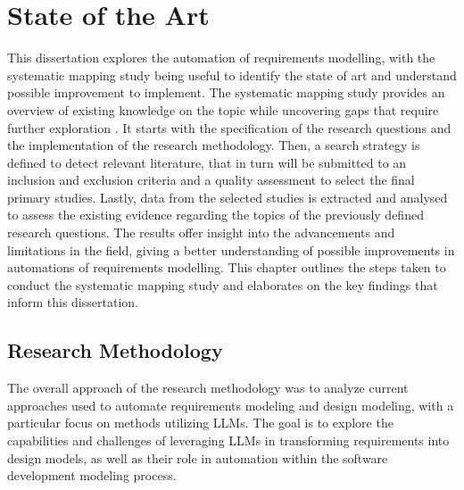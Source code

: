 
%

\makeatletter
\newcommand{\ntifpkgloaded}{%
  \@ifpackageloaded%
}
\makeatother


\chapter{State of the Art}
\label{cha:state_of_the_art}

This dissertation explores the automation of requirements modelling, with the systematic mapping study being useful to identify the state of art and understand possible improvement to implement. The systematic mapping study provides an overview of existing knowledge on the topic while uncovering gaps that require further exploration \cite{22BPetersen2008}. It starts with the specification of the research questions and the implementation of the research methodology. Then, a search strategy is defined to detect relevant literature, that in turn will be submitted to an inclusion and exclusion criteria and a quality assessment to select the final primary studies. Lastly, data from the selected studies is extracted and analysed to assess the existing evidence regarding the topics of the previously defined research questions. The results offer insight into the advancements and limitations in the field, giving a better understanding of possible improvements in automations of requirements modelling. This chapter outlines the steps taken to conduct the systematic mapping study and elaborates on the key findings that inform this dissertation.

\section{Research Methodology}
\label{sec:research_methodology}

The overall approach of the research methodology was to analyze current approaches used to automate requirements modeling and design modeling, with a particular focus on methods utilizing LLMs. The goal is to explore the capabilities and challenges of leveraging LLMs in transforming requirements into design models, as well as their role in automation within the software development modeling process. 


